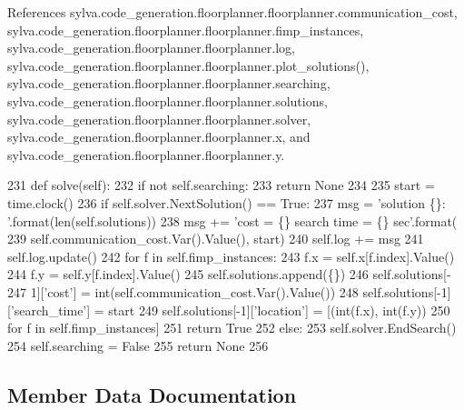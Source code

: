 References sylva.\+code\+\_\+generation.\+floorplanner.\+floorplanner.\+communication\+\_\+cost, sylva.\+code\+\_\+generation.\+floorplanner.\+floorplanner.\+fimp\+\_\+instances, sylva.\+code\+\_\+generation.\+floorplanner.\+floorplanner.\+log, sylva.\+code\+\_\+generation.\+floorplanner.\+floorplanner.\+plot\+\_\+solutions(), sylva.\+code\+\_\+generation.\+floorplanner.\+floorplanner.\+searching, sylva.\+code\+\_\+generation.\+floorplanner.\+floorplanner.\+solutions, sylva.\+code\+\_\+generation.\+floorplanner.\+floorplanner.\+solver, sylva.\+code\+\_\+generation.\+floorplanner.\+floorplanner.\+x, and sylva.\+code\+\_\+generation.\+floorplanner.\+floorplanner.\+y.


\begin{DoxyCode}
231   \textcolor{keyword}{def }solve(self):
232     \textcolor{keywordflow}{if} \textcolor{keywordflow}{not} self.searching:
233       \textcolor{keywordflow}{return} \textcolor{keywordtype}{None}
234 
235     start = time.clock()
236     \textcolor{keywordflow}{if} self.solver.NextSolution() == \textcolor{keyword}{True}:
237       msg = \textcolor{stringliteral}{'solution \{\}: '}.format(len(self.solutions))
238       msg += \textcolor{stringliteral}{'cost = \{\} search time = \{\} sec'}.format(
239         self.communication\_cost.Var().Value(), start)
240       self.log += msg
241       self.log.update()
242       \textcolor{keywordflow}{for} f \textcolor{keywordflow}{in} self.fimp\_instances:
243         f.x = self.x[f.index].Value()
244         f.y = self.y[f.index].Value()
245       self.solutions.append(\{\})
246       self.solutions[-
247                1][\textcolor{stringliteral}{'cost'}] = int(self.communication\_cost.Var().Value())
248       self.solutions[-1][\textcolor{stringliteral}{'search\_time'}] = start
249       self.solutions[-1][\textcolor{stringliteral}{'location'}] = [(int(f.x), int(f.y))
250                         \textcolor{keywordflow}{for} f \textcolor{keywordflow}{in} self.fimp\_instances]
251       \textcolor{keywordflow}{return} \textcolor{keyword}{True}
252     \textcolor{keywordflow}{else}:
253       self.solver.EndSearch()
254       self.searching = \textcolor{keyword}{False}
255       \textcolor{keywordflow}{return} \textcolor{keywordtype}{None}
256 
\end{DoxyCode}


\subsection{Member Data Documentation}
\mbox{\label{classsylva_1_1code__generation_1_1floorplanner_1_1floorplanner_aeb0a7c06073d6f238ca448fd31a08e75}} 
